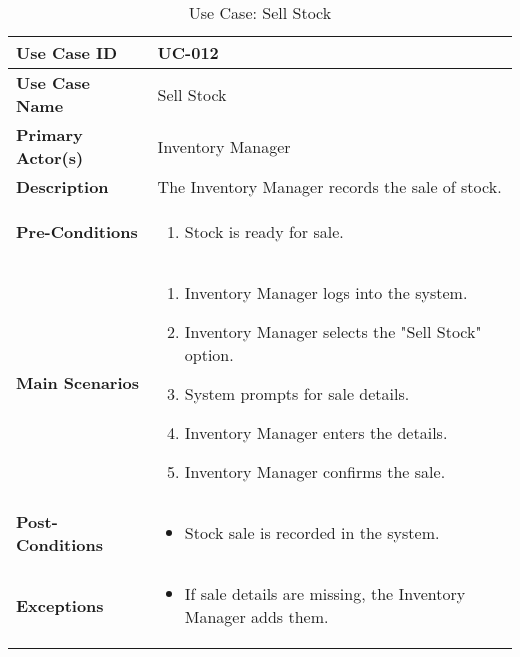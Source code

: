 \documentclass{article}
\begin{document}
\begin{table}[!ht]
    \centering
    \renewcommand{\arraystretch}{1.3}
    \begin{tabularx}{\textwidth}{|l|X|}
        \hline
        \textbf{Use Case ID} & UC-012 \\
        \hline
        \textbf{Use Case Name} & Sell Stock \\
        \hline
        \textbf{Primary Actor(s)} & Inventory Manager \\
        \hline
        \textbf{Description} & The Inventory Manager records the sale of stock. \\
        \hline
        \textbf{Pre-Conditions} & 
        \begin{enumerate}[label=\arabic*.,itemsep=0pt]
            \item Stock is ready for sale.
        \end{enumerate} \\
        \hline
        \textbf{Main Scenarios} & 
        \begin{enumerate}[label=\arabic*.,itemsep=0pt]
            \item Inventory Manager logs into the system.
            \item Inventory Manager selects the "Sell Stock" option.
            \item System prompts for sale details.
            \item Inventory Manager enters the details.
            \item Inventory Manager confirms the sale.
        \end{enumerate} \\
        \hline
        \textbf{Post-Conditions} & 
        \begin{itemize}[label=--,itemsep=0pt]
            \item Stock sale is recorded in the system.
        \end{itemize} \\
        \hline
        \textbf{Exceptions} & 
        \begin{itemize}[label=--,itemsep=0pt]
            \item If sale details are missing, the Inventory Manager adds them.
        \end{itemize} \\
        \hline
    \end{tabularx}
    \caption{Use Case: Sell Stock}
    \label{tab:use-case-sell-stock}
\end{table}
\end{document}
